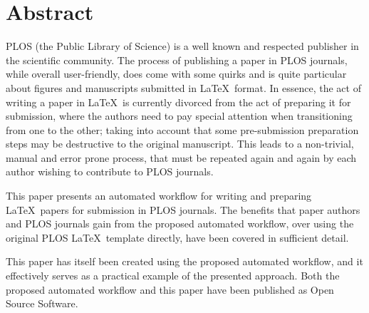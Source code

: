 \section*{Abstract}

PLOS (the Public Library of Science) is a well known and respected publisher in the scientific community.
The process of publishing a paper in PLOS journals, while overall user-friendly, does come with some quirks and is quite particular about figures and manuscripts submitted in \LaTeX~format.
In essence, the act of writing a paper in \LaTeX~is currently divorced from the act of preparing it for submission, where the authors need to pay special attention when transitioning from one to the other; taking into account that some pre-submission preparation steps may be destructive to the original manuscript.
This leads to a non-trivial, manual and error prone process, that must be repeated again and again by each author wishing to contribute to PLOS journals.

This paper presents an automated workflow for writing and preparing \LaTeX~papers for submission in PLOS journals.
The benefits that paper authors and PLOS journals gain from the proposed automated workflow, over using the original PLOS \LaTeX~template directly, have been covered in sufficient detail.

This paper has itself been created using the proposed automated workflow, and it effectively serves as a practical example of the presented approach.
Both the proposed automated workflow and this paper have been published as Open Source Software.

